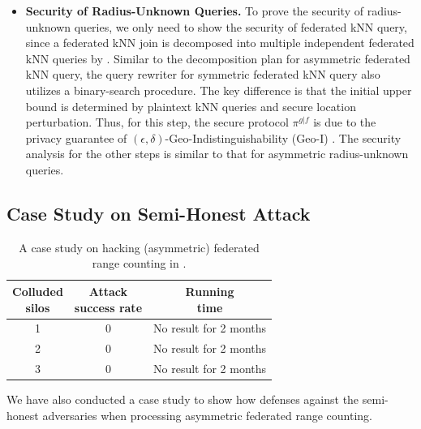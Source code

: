 \begin{itemize}
    \item \textbf{Security of Radius-Unknown Queries.} 
    To prove the security of radius-unknown queries, we only need to show the security of federated kNN query,
    since a federated kNN join is decomposed into multiple independent federated kNN queries by \sysname.
    Similar to the decomposition plan for asymmetric federated kNN query, the query rewriter for symmetric federated kNN query also utilizes a binary-search procedure.
    The key difference is that the initial upper bound is determined by plaintext kNN queries and secure location perturbation.
    Thus, for this step, the secure protocol $\pi^{g|f}$ is due to the privacy guarantee of $(\epsilon,\delta)$-Geo-Indistinguishability (Geo-I) \cite{DBLP:conf/ccs/AndresBCP13}.
    The security analysis for the other steps is similar to that for asymmetric radius-unknown queries.
\end{itemize}

\subsection{Case Study on Semi-Honest Attack}\label{app:secure-case}

\begin{table}[t]
    \centering
    \caption{A case study on hacking (asymmetric) federated range counting in \sysname.}
    \begin{small}
    \begin{tabular}{ccc}
		\toprule
		\makecell[c]{Colluded\\silos} & \makecell[c]{Attack\\success rate}  & \makecell[c]{Running\\time}  \\
		\midrule
		1             & $0$         & No result for 2 months    \\
		2             & $0$         & No result for 2 months    \\
		3             & $0$         & No result for 2 months    \\
		\bottomrule
    \end{tabular}
    \end{small}
    \label{tab:attack}
\end{table}

We have also conducted a case study to show how \sysname defenses against the semi-honest adversaries when processing asymmetric federated range counting.

